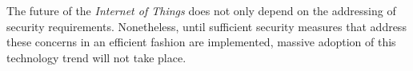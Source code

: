 \documentclass[journal]{IEEEtran}
\begin{document}
  The future of the \emph{Internet of Things} does not only depend on the addressing of security requirements. Nonetheless, until sufficient security measures that address these concerns in an efficient fashion are implemented, massive adoption of this technology trend will not take place. 
  
  



\end{document}

